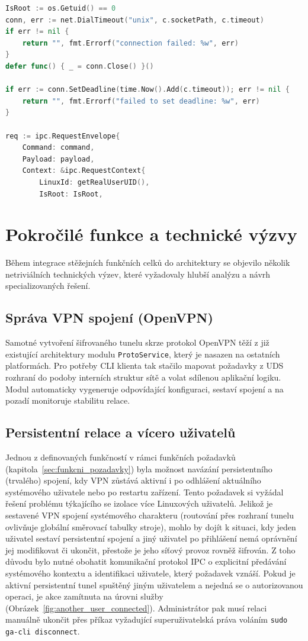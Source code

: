 \noindent\begin{minipage}{\linewidth}
\begin{lstlisting}[language=Go, stringstyle=\itshape]
IsRoot := os.Getuid() == 0  
conn, err := net.DialTimeout("unix", c.socketPath, c.timeout)
if err != nil {
	return "", fmt.Errorf("connection failed: %w", err)
}
defer func() { _ = conn.Close() }()

if err := conn.SetDeadline(time.Now().Add(c.timeout)); err != nil {
	return "", fmt.Errorf("failed to set deadline: %w", err)
}

req := ipc.RequestEnvelope{
	Command: command,
	Payload: payload,
	Context: &ipc.RequestContext{
		LinuxId: getRealUserUID(),
		IsRoot: IsRoot, 
\end{lstlisting}
\end{minipage}

\section{Pokročilé funkce a technické výzvy}
Během integrace stěžejních funkčních celků do architektury se objevilo několik netriviálních technických výzev, které vyžadovaly hlubší analýzu a návrh specializovaných řešení.

\subsection{Správa VPN spojení (OpenVPN)}
Samotné vytvoření šifrovaného tunelu skrze protokol OpenVPN těží z již existující architektury modulu \texttt{ProtoService}, který je nasazen na ostatních platformách. Pro potřeby CLI klienta tak stačilo mapovat požadavky z UDS rozhraní do podoby interních struktur sítě a volat sdílenou aplikační logiku. Modul automaticky vygeneruje odpovídající konfiguraci, sestaví spojení a na pozadí monitoruje stabilitu relace.

\subsection{Persistentní relace a vícero uživatelů}
Jednou z definovaných funkčností v rámci funkčních požadavků (kapitola~\ref{sec:funkcni_pozadavky}) byla možnost navázání persistentního (trvalého) spojení, kdy VPN zůstává aktivní i po odhlášení aktuálního systémového uživatele nebo po restartu zařízení. Tento požadavek si vyžádal řešení problému týkajícího se izolace více Linuxových uživatelů. Jelikož je sestavené VPN spojení systémového charakteru (routování přes rozhraní tunelu ovlivňuje globální směrovací tabulky stroje), mohlo by dojít k situaci, kdy jeden uživatel sestaví persistentní spojení a jiný uživatel po přihlášení nemá oprávnění jej modifikovat či ukončit, přestože je jeho síťový provoz rovněž šifrován. Z toho důvodu bylo nutné obohatit komunikační protokol IPC o explicitní předávání systémového kontextu a identifikaci uživatele, který požadavek vznáší. Pokud je aktivní persistentní tunel spuštěný jiným uživatelem a nejedná se o autorizovanou operaci, je akce zamítnuta na úrovni služby (Obrázek~\ref{fig:another_user_connected}). Administrátor pak musí relaci manuálně ukončit přes příkaz vyžadující superuživatelská práva voláním \texttt{sudo ga-cli disconnect}.

